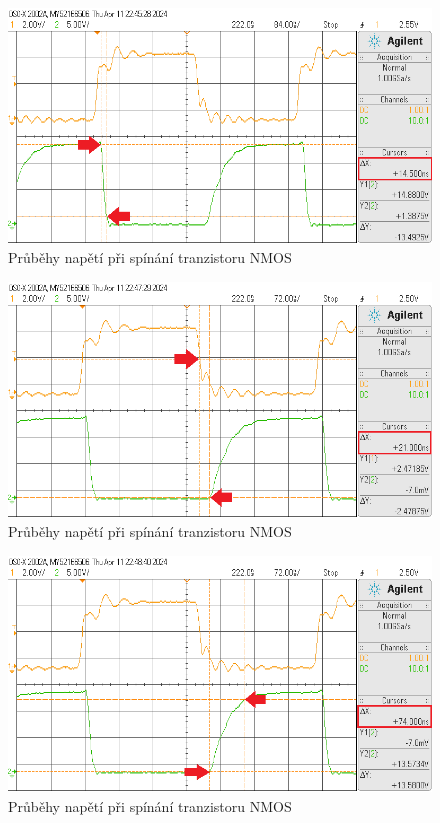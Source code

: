 \documentclass[a4paper, czech]{article}
\begin{document}
\begin{figure}[H]
    \centering
    \includegraphics[width=\textwidth]{t_f.png}
    \caption{Průběhy napětí při spínání tranzistoru NMOS}
\end{figure}

\begin{figure}[H]
    \centering
    \includegraphics[width=\textwidth]{t_dr.png}
    \caption{Průběhy napětí při spínání tranzistoru NMOS}
\end{figure}

\begin{figure}[H]
    \centering
    \includegraphics[width=\textwidth]{t_r.png}
    \caption{Průběhy napětí při spínání tranzistoru NMOS}
\end{figure}
\end{document}
